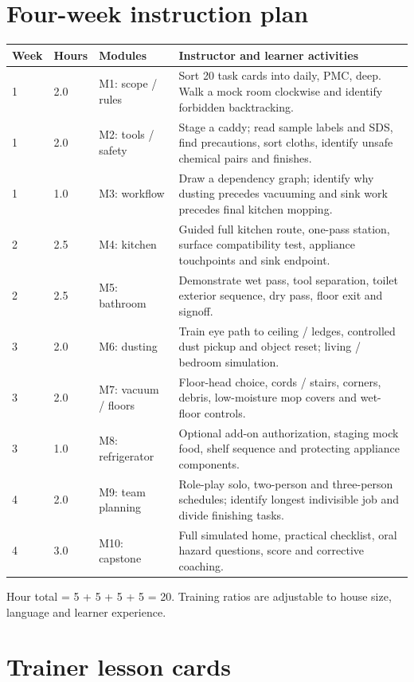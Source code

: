 \documentclass[10pt,letterpaper,oneside]{article}
\newcommand{\subtle}[1]{{\color{graytext}\small #1}}
\newcommand{\smalltable}{\par\small\renewcommand{\arraystretch}{1.24}}
\newcommand{\restorenormalfonttable}{\par\normalsize\renewcommand{\arraystretch}{1}}
\begin{document}
\section{Four-week instruction plan}
\smalltable\begin{longtable}{p{.09\linewidth}p{.09\linewidth}p{.26\linewidth}p{.42\linewidth}}\toprule
Week & Hours & Modules & Instructor and learner activities\\\midrule\endhead
1 & 2.0 & M1: scope / rules & Sort 20 task cards into daily, PMC, deep. Walk a mock room clockwise and identify forbidden backtracking.\\
1 & 2.0 & M2: tools / safety & Stage a caddy; read sample labels and SDS, find precautions, sort cloths, identify unsafe chemical pairs and finishes.\\
1 & 1.0 & M3: workflow & Draw a dependency graph; identify why dusting precedes vacuuming and sink work precedes final kitchen mopping.\\\midrule
2 & 2.5 & M4: kitchen & Guided full kitchen route, one-pass station, surface compatibility test, appliance touchpoints and sink endpoint.\\
2 & 2.5 & M5: bathroom & Demonstrate wet pass, tool separation, toilet exterior sequence, dry pass, floor exit and signoff.\\\midrule
3 & 2.0 & M6: dusting & Train eye path to ceiling / ledges, controlled dust pickup and object reset; living / bedroom simulation.\\
3 & 2.0 & M7: vacuum / floors & Floor-head choice, cords / stairs, corners, debris, low-moisture mop covers and wet-floor controls.\\
3 & 1.0 & M8: refrigerator & Optional add-on authorization, staging mock food, shelf sequence and protecting appliance components.\\\midrule
4 & 2.0 & M9: team planning & Role-play solo, two-person and three-person schedules; identify longest indivisible job and divide finishing tasks.\\
4 & 3.0 & M10: capstone & Full simulated home, practical checklist, oral hazard questions, score and corrective coaching.\\\bottomrule\end{longtable}\restorenormalfonttable
\subtle{Hour total = 5 + 5 + 5 + 5 = 20. Training ratios are adjustable to house size, language and learner experience.}

\section{Trainer lesson cards}
\end{document}
